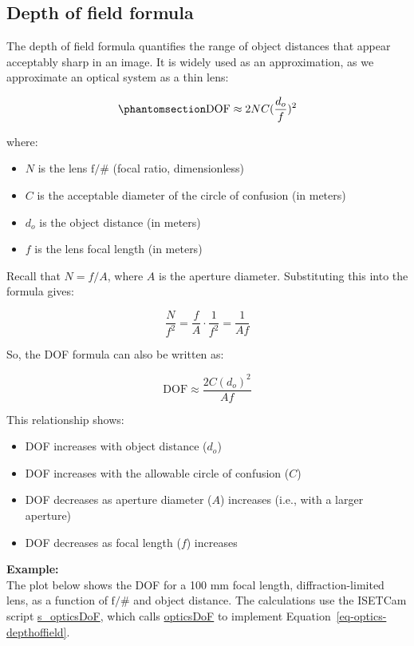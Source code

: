 \documentclass[
  letterpaper,
]{book}
\providecommand{\tightlist}{%
  \setlength{\itemsep}{0pt}\setlength{\parskip}{0pt}}\usepackage{longtable,booktabs,array}
\begin{document}
\subsection{Depth of field formula}\label{sec-optics-dof-formula}

The depth of field formula quantifies the range of object distances that
appear acceptably sharp in an image. It is widely used as an
approximation, as we approximate an optical system as a thin lens:

\begin{equation}\phantomsection\label{eq-optics-depthoffield}{
\text{DOF} \approx 2 N C ({\frac{d_o}{f}})^2
}\end{equation}

where:

\begin{itemize}
\tightlist
\item
  \(N\) is the lens \(\mathrm{f}/\#\) (focal ratio, dimensionless)
\item
  \(C\) is the acceptable diameter of the circle of confusion (in
  meters)
\item
  \(d_o\) is the object distance (in meters)
\item
  \(f\) is the lens focal length (in meters)
\end{itemize}

Recall that \(N = f/A\), where \(A\) is the aperture diameter.
Substituting this into the formula gives:

\[
\frac{N}{f^2} = \frac{f}{A} \cdot \frac{1}{f^2} = \frac{1}{A f}
\]

So, the DOF formula can also be written as:

\[
\text{DOF} \approx \frac{2 C (d_o)^2}{A f}
\]

This relationship shows:

\begin{itemize}
\tightlist
\item
  DOF increases with object distance (\(d_o\))
\item
  DOF increases with the allowable circle of confusion (\(C\))
\item
  DOF decreases as aperture diameter (\(A\)) increases (i.e., with a
  larger aperture)
\item
  DOF decreases as focal length (\(f\)) increases
\end{itemize}

\textbf{Example:}\\
The plot below shows the DOF for a 100 mm focal length,
diffraction-limited lens, as a function of \(\mathrm{f}/\#\) and object
distance. The calculations use the ISETCam script
\href{https://github.com/iset/ISETCam/blob/main/scripts/optics/focus_dof/s_opticsDoF.m}{s\_opticsDoF},
which calls
\href{https://github.com/iset/ISETCam/blob/main/opticalimage/optics/opticsDoF.m}{opticsDoF}
to implement Equation~\ref{eq-optics-depthoffield}.
\end{document}
